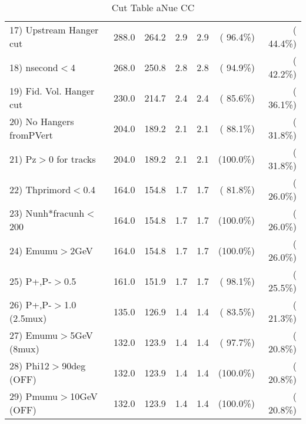 \begin{table}[h!]
\begin{tabular}{||l||r|r|r|r|r|r||}
 17) Upstream Hanger cut  &        288.0 &        264.2 &          2.9 &          2.9 & ( 96.4\%) & ( 44.4\%) \\
 18) nsecond$<$4          &        268.0 &        250.8 &          2.8 &          2.8 & ( 94.9\%) & ( 42.2\%) \\
 19) Fid. Vol. Hanger cut &        230.0 &        214.7 &          2.4 &          2.4 & ( 85.6\%) & ( 36.1\%) \\
 20) No Hangers fromPVert &        204.0 &        189.2 &          2.1 &          2.1 & ( 88.1\%) & ( 31.8\%) \\
 21) Pz$>$0 for tracks    &        204.0 &        189.2 &          2.1 &          2.1 & (100.0\%) & ( 31.8\%) \\
 22) Thprimord$<$0.4      &        164.0 &        154.8 &          1.7 &          1.7 & ( 81.8\%) & ( 26.0\%) \\
 23) Nunh*fracunh$<$200   &        164.0 &        154.8 &          1.7 &          1.7 & (100.0\%) & ( 26.0\%) \\
 24) Emumu$>$2GeV         &        164.0 &        154.8 &          1.7 &          1.7 & (100.0\%) & ( 26.0\%) \\
 25) P+,P-$>$0.5          &        161.0 &        151.9 &          1.7 &          1.7 & ( 98.1\%) & ( 25.5\%) \\
 26) P+,P-$>$1.0 (2.5mux) &        135.0 &        126.9 &          1.4 &          1.4 & ( 83.5\%) & ( 21.3\%) \\
 27) Emumu$>$5GeV  (8mux) &        132.0 &        123.9 &          1.4 &          1.4 & ( 97.7\%) & ( 20.8\%) \\
 28) Phi12$>$90deg  (OFF) &        132.0 &        123.9 &          1.4 &          1.4 & (100.0\%) & ( 20.8\%) \\
 29) Pmumu$>$10GeV  (OFF) &        132.0 &        123.9 &          1.4 &          1.4 & (100.0\%) & ( 20.8\%) \\
 \hline
 \hline
 \end{tabular}
 \caption{Cut Table  aNue CC  }
 \label{tab-cutcohjpsi-mumu_anuecc}
 \end{table}
